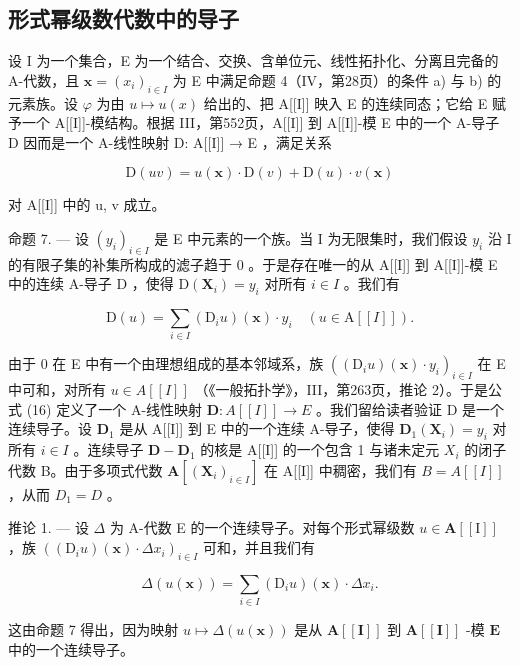 \subsection{形式幂级数代数中的导子}

设 I 为一个集合，E 为一个结合、交换、含单位元、线性拓扑化、分离且完备的 A-代数，且 \(\mathbf{x} = (x_{i})_{i \in I}\) 为 E 中满足命题 4（IV，第28页）的条件 a) 与 b) 的元素族。设 \(\varphi\) 为由 \(u \mapsto u(x)\) 给出的、把 A{[}{[}I{]}{]} 映入 E 的连续同态；它给 E 赋予一个 A{[}{[}I{]}{]}-模结构。根据 III，第552页，A{[}{[}I{]}{]} 到 A{[}{[}I{]}{]}-模 E 中的一个 A-导子 D 因而是一个 A-线性映射 D: A{[}{[}I{]}{]} → E ，满足关系

\[
\mathrm{D} (u v) = u (\mathbf {x}) \cdot \mathrm{D} (v) + \mathrm{D} (u) \cdot v (\mathbf {x})\tag{15}
\]

对 A{[}{[}I{]}{]} 中的 u, v 成立。

命题 7. --- 设 \((y_{i})_{i\in I}\) 是 E 中元素的一个族。当 I 为无限集时，我们假设 \(y_{i}\) 沿 I 的有限子集的补集所构成的滤子趋于 0 。于是存在唯一的从 A{[}{[}I{]}{]} 到 A{[}{[}I{]}{]}-模 E 中的连续 A-导子 D ，使得 \(\mathrm{D}(\mathbf{X}_{i})=y_{i}\) 对所有 \(i\in I\) 。我们有

\[
\mathrm{D} (u) = \sum_ {i \in I} (\mathrm{D} _ {i} u) (\mathbf {x}) \cdot y _ {i} \quad (u \in \mathrm{A} [ [ I ] ])  .\tag{16}
\]

由于 0 在 E 中有一个由理想组成的基本邻域系，族 \(((\mathrm{D}_i u)(\mathbf{x}) \cdot y_i)_{i \in I}\) 在 E 中可和，对所有 \(u \in A[[I]]\) （《一般拓扑学》，III，第263页，推论 2）。于是公式 (16) 定义了一个 A-线性映射 \(\mathbf{D}: A[[I]] \to E\) 。我们留给读者验证 D 是一个连续导子。设 \(\mathbf{D}_1\) 是从 A{[}{[}I{]}{]} 到 E 中的一个连续 A-导子，使得 \(\mathbf{D}_1(\mathbf{X}_i) = y_i\) 对所有 \(i \in I\) 。连续导子 \(\mathbf{D} - \mathbf{D}_1\) 的核是 A{[}{[}I{]}{]} 的一个包含 1 与诸未定元 \(X_{i}\) 的闭子代数 B。由于多项式代数 \(\mathbf{A}[(\mathbf{X}_{i})_{i\in I}]\) 在 A{[}{[}I{]}{]} 中稠密，我们有 \(B = A[[I]]\) ，从而 \(D_{1} = D\) 。

推论 1. --- 设 \(\Delta\) 为 A-代数 E 的一个连续导子。对每个形式幂级数 \(u \in \mathbf{A}[[\mathrm{I}]]\) ，族 \(((\mathrm{D}_i u)(\mathbf{x}) \cdot \Delta x_i)_{i \in I}\) 可和，并且我们有

\[
\Delta (u (\mathbf {x})) = \sum_ {i \in I} \left(\mathrm{D} _ {i} u\right) (\mathbf {x}) \cdot \Delta x _ {i}.\tag{17}
\]

这由命题 7 得出，因为映射 \(u \mapsto \Delta(u(\mathbf{x}))\) 是从 \(\mathbf{A}[[\mathbf{I}]]\) 到 \(\mathbf{A}[[\mathbf{I}]]\) -模 \(\mathbf{E}\) 中的一个连续导子。

